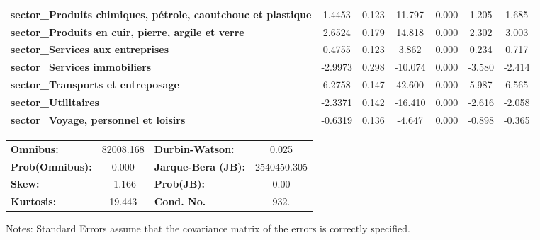 \begin{center}
\begin{tabular}{lcccccc}
\textbf{sector\_Produits chimiques, pétrole, caoutchouc et plastique} &       1.4453  &        0.123     &    11.797  &         0.000        &        1.205    &        1.685     \\
\textbf{sector\_Produits en cuir, pierre, argile et verre}            &       2.6524  &        0.179     &    14.818  &         0.000        &        2.302    &        3.003     \\
\textbf{sector\_Services aux entreprises}                             &       0.4755  &        0.123     &     3.862  &         0.000        &        0.234    &        0.717     \\
\textbf{sector\_Services immobiliers}                                 &      -2.9973  &        0.298     &   -10.074  &         0.000        &       -3.580    &       -2.414     \\
\textbf{sector\_Transports et entreposage}                            &       6.2758  &        0.147     &    42.600  &         0.000        &        5.987    &        6.565     \\
\textbf{sector\_Utilitaires}                                          &      -2.3371  &        0.142     &   -16.410  &         0.000        &       -2.616    &       -2.058     \\
\textbf{sector\_Voyage, personnel et loisirs}                         &      -0.6319  &        0.136     &    -4.647  &         0.000        &       -0.898    &       -0.365     \\
\bottomrule
\end{tabular}
\begin{tabular}{lclc}
\textbf{Omnibus:}       & 82008.168 & \textbf{  Durbin-Watson:     } &      0.025   \\
\textbf{Prob(Omnibus):} &    0.000  & \textbf{  Jarque-Bera (JB):  } & 2540450.305  \\
\textbf{Skew:}          &   -1.166  & \textbf{  Prob(JB):          } &       0.00   \\
\textbf{Kurtosis:}      &   19.443  & \textbf{  Cond. No.          } &       932.   \\
\bottomrule
\end{tabular}
\end{center}

Notes: \newline
 [1] Standard Errors assume that the covariance matrix of the errors is correctly specified.